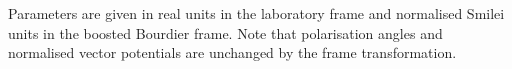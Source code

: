 %
Parameters are given in real units in the laboratory frame and normalised Smilei units in the boosted Bourdier frame. Note that polarisation angles and normalised vector potentials are unchanged by the frame transformation. 

